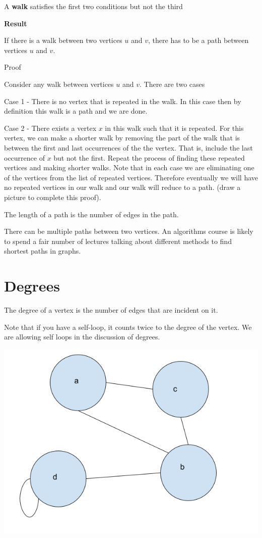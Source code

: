 \documentclass[12pt]{article}
\begin{document}
A \textbf{walk} satisfies the first two conditions but not the third

\medskip

\textbf{Result}

If there is a walk between two vertices $u$ and $v$, there has to be a path between vertices $u$ and $v$.

Proof

Consider any walk between vertices $u$ and $v$. There are two cases

Case 1 - There is no vertex that is repeated in the walk. In this case then by definition this walk is a path and we are done.

Case 2 - There exists a vertex $x$ in this walk such that it is repeated. For this vertex, we can make a shorter walk by removing the part of the walk that is between the first and last occurrences of the the vertex. That is, include the last occurrence of $x$ but not the first. Repeat the process of finding these repeated vertices and making shorter walks. Note that in each case we are eliminating one of the vertices from the list of repeated vertices. Therefore eventually we will have no repeated vertices in our walk and our walk will reduce to a path. (draw a picture to complete this proof).

\medskip

The length of a path is the number of edges in the path.

There can be multiple paths between two vertices. An algorithms course is likely to spend a fair number of lectures talking about different methods to find shortest paths in graphs.

\section*{Degrees}

The degree of a vertex is the number of edges that are incident on it. 

Note that if you have a self-loop, it counts twice to the degree of the vertex. We are allowing self loops in the discussion of degrees.

\includegraphics[scale=0.5]{./img/graph2.png}
\end{document}
